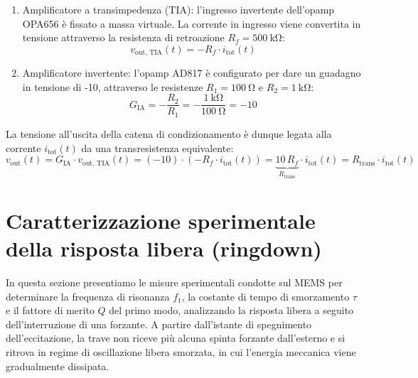 \documentclass[11pt,a4paper]{article}
\begin{document}
\begin{enumerate}
    \item 
    Amplificatore a transimpedenza (TIA): l'ingresso invertente dell'opamp OPA656 è fissato a massa virtuale. La corrente in ingresso viene convertita in tensione attraverso la resistenza di retroazione $R_f=\SI{500}{\kilo\ohm}$:
    \begin{equation}
        v_{\text{out, TIA}}(t) = - R_f \cdot i_{\text{tot}}(t)
    \end{equation}
    \item 
    Amplificatore invertente: l'opamp AD817 è configurato per dare un guadagno in tensione di -10, attraverso le resistenze $R_1 = \SI{100}{\ohm}$ e $R_2 = \SI{1}{\kilo\ohm}$:
    \begin{equation}
        G_{\text{IA}} = -\frac{R_2}{R_1} = -\frac{\SI{1}{\kilo\ohm}}{\SI{100}{\ohm}} = -10
    \end{equation}
\end{enumerate}

\noindent La tensione all'uscita della catena di condizionamento è dunque legata alla corrente $i_{\text{tot}}(t)$ da una transresistenza equivalente:
\begin{equation}
    \label{eq:transresistenza_totale}
    v_{\text{out}}(t) = G_{\text{IA}} \cdot v_{\text{out, TIA}}(t) = (-10) \cdot \left( -R_f \cdot i_{\text{tot}}(t) \right) = \underbrace{10 \, R_f}_{R_{\text{trans}}} \cdot i_{\text{tot}}(t) = R_{\text{trans}} \cdot i_{\text{tot}}(t)
\end{equation}

\newpage
\section{Caratterizzazione sperimentale della risposta libera (ringdown)}
\label{sec:ringdown}

In questa sezione presentiamo le misure sperimentali condotte sul MEMS per determinare la frequenza di risonanza $f_1$, la costante di tempo di smorzamento $\tau$ e il fattore di merito $Q$ del primo modo, analizzando la risposta libera a seguito dell'interruzione di una forzante. A partire dall'istante di spegnimento dell'eccitazione, la trave non riceve più alcuna spinta forzante dall'esterno e si ritrova in regime di oscillazione libera smorzata, in cui l'energia meccanica viene gradualmente dissipata.
\end{document}
